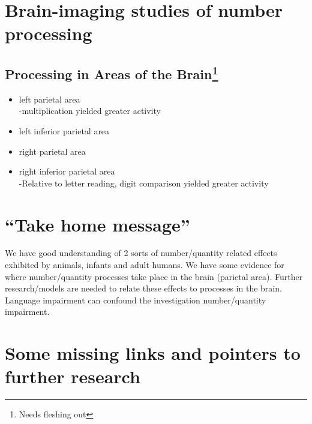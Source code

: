 \documentclass[12pt]{article}
\begin{document}
\section{Brain-imaging studies of number processing}

\subsection*{Processing in Areas of the Brain\footnote{Needs fleshing out}}
\begin{itemize}
\item left parietal area \\
-multiplication yielded greater activity
\item left inferior parietal area
\item right parietal area
\item right inferior parietal area \\
-Relative to letter reading, digit comparison yielded greater
activity
\end{itemize}


\section{``Take home message''}
We have good understanding of 2 sorts of number/quantity related effects exhibited by animals, infants and adult humans. We have some evidence for where number/quantity processes take place in the brain (parietal area). Further research/models are needed to relate these effects to processes in the brain. Language impairment can confound the investigation number/quantity impairment.




\section{Some missing links and pointers to further
research}
\end{document}
